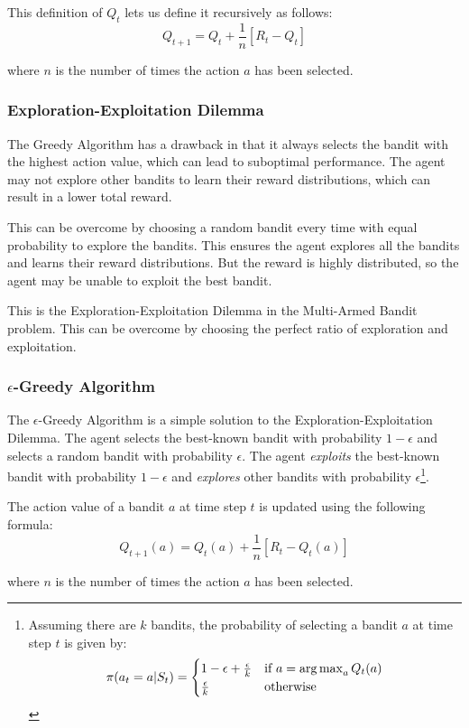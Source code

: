 This definition of $Q_t$ lets us define it recursively as follows:
\[Q_{t+1} = Q_t + \frac{1}{n}[R_t - Q_t]\]

where $n$ is the number of times the action $a$ has been selected.

\subsubsection{Exploration-Exploitation Dilemma}

The Greedy Algorithm has a drawback in that it always selects the bandit with the highest action value, which can lead to suboptimal performance. The agent may not explore other bandits to learn their reward distributions, which can result in a lower total reward.

This can be overcome by choosing a random bandit every time with equal probability to explore the bandits. This ensures the agent explores all the bandits and learns their reward distributions. But the reward is highly distributed, so the agent may be unable to exploit the best bandit.

This is the Exploration-Exploitation Dilemma in the Multi-Armed Bandit problem. This can be overcome by choosing the perfect ratio of exploration and exploitation.

\subsubsection{$\epsilon$-Greedy Algorithm}

The $\epsilon$-Greedy Algorithm is a simple solution to the Exploration-Exploitation Dilemma. The agent selects the best-known bandit with probability $1-\epsilon$ and selects a random bandit with probability $\epsilon$. The agent \textit{exploits} the best-known bandit with probability $1-\epsilon$ and \textit{explores} other bandits with probability $\epsilon$\footnote{Assuming there are $k$ bandits, the probability of selecting a bandit $a$ at time step $t$ is given by:
\[\pi(a_t=a|S_t) = \begin{cases}
    1-\epsilon + \frac{\epsilon}{k} & \text{if } a = \operatorname*{arg\,max}_{a} Q_t(a) \\ \frac{\epsilon}{k} & \text{otherwise}
\end{cases}\]}.

The action value of a bandit $a$ at time step $t$ is updated using the following formula:
\[Q_{t+1}(a) = Q_t(a) + \frac{1}{n}[R_t - Q_t(a)]\]

where $n$ is the number of times the action $a$ has been selected.


